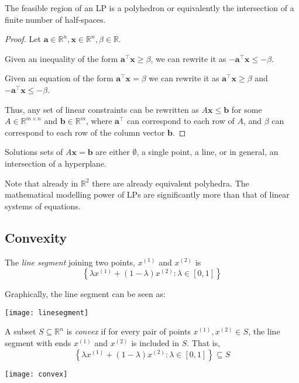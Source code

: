 \begin{thmbox}
    \begin{theorem}
        The feasible region of an LP is a polyhedron or equivalently the
        intersection of a finite number of half-spaces.
    \end{theorem}
\end{thmbox}
\begin{proof}
    Let $ \bm{a}\in\mathbb{R}^n,\bm{x}\in\mathbb{R}^n,\beta\in \mathbb{R} $.

    Given an inequality of the form $ \bm{a} ^\top \bm{x}\geqslant  \beta $, we can
    rewrite it as $ -\bm{a} ^\top \bm{x}\leqslant -\beta $.

    Given an equation of the form $ \bm{a} ^\top \bm{x}=\beta $ we can rewrite it as
    $ \bm{a} ^\top \bm{x}\geqslant  \beta $ and $ -\bm{a} ^\top \bm{x}\leqslant -\beta $.

    Thus, any set of linear constraints can be rewritten as
    $ A\bm{x}\leqslant \bm{b} $ for some $ A\in \mathbb{R}^{m \times n} $ and $ \bm{b}\in \mathbb{R}^m $, where $ \bm{a}^\top $ can correspond to each row of $ A $,
    and $ \beta $ can correspond to each row of the column vector $ \bm{b} $.
\end{proof}

Solutions sets of $ A\bm{x}=\bm{b} $ are either $ \emptyset $, a single
point, a line, or in general, an intersection of a hyperplane.

Note that already in $ \mathbb{R}^2 $ there are already equivalent polyhedra.
The mathematical modelling power of LPs are significantly more than that of
linear systems of equations.

\subsection{Convexity}

\begin{defbox}
    \begin{definition}
        The \emph{line segment} joining two points, $ x^{(1)} $ and $ x^{(2)} $ is
        \[ \left\{\lambda x^{(1)} + (1-\lambda)x^{(2)}:\lambda\in[0,1]\right\} \]
    \end{definition}
\end{defbox}
Graphically, the line segment can be seen as:
\begin{center}
    \texttt{[image: linesegment]}
\end{center}

\begin{defbox}
    \begin{definition}
        A subset $ S\subseteq \mathbb{R}^n $ is \emph{convex} if for
        every pair of points $ x^{(1)},x^{(2)}\in S $, the line segment with
        ends $ x^{(1)} $ and $ x^{(2)} $ is included in $ S $. That is,
        \[ \left\{\lambda x^{(1)} + (1-\lambda)x^{(2)}:\lambda\in[0,1]\right\}\subseteq S \]
    \end{definition}
\end{defbox}
\begin{center}
    \texttt{[image: convex]}
\end{center}

